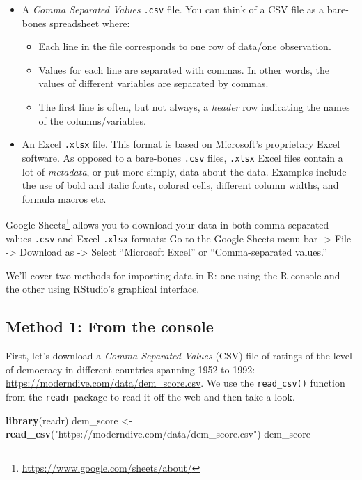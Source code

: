 \documentclass[12pt,]{krantz}
\makeatletter
\newenvironment{Shaded}{\begin{snugshade}}{\end{snugshade}}
\newcommand{\KeywordTok}[1]{\textcolor[rgb]{0.27,0.27,0.27}{\textbf{#1}}}
\newcommand{\StringTok}[1]{\textcolor[rgb]{0.5,0.5,0.5}{#1}}
\newcommand{\NormalTok}[1]{#1}
\providecommand{\tightlist}{%
  \setlength{\itemsep}{0pt}\setlength{\parskip}{0pt}}
\renewcommand{\href}[2]{#2\footnote{\url{#1}}}
\newenvironment{kframe}{%
\medskip{}
\setlength{\fboxsep}{.8em}
 \def\at@end@of@kframe{}%
 \ifinner\ifhmode%
  \def\at@end@of@kframe{\end{minipage}}%
  \begin{minipage}{\columnwidth}%
 \fi\fi%
 \def\FrameCommand##1{\hskip\@totalleftmargin \hskip-\fboxsep
 \colorbox{shadecolor}{##1}\hskip-\fboxsep
     \hskip-\linewidth \hskip-\@totalleftmargin \hskip\columnwidth}%
 \MakeFramed {\advance\hsize-\width
   \@totalleftmargin\z@ \linewidth\hsize
   \@setminipage}}%
 {\par\unskip\endMakeFramed%
 \at@end@of@kframe}
\renewenvironment{Shaded}{\begin{kframe}}{\end{kframe}}
\theoremstyle{definition}
\theoremstyle{definition}
\theoremstyle{definition}
\theoremstyle{remark}
\makeatother
\begin{document}
\begin{itemize}
\tightlist
\item
  A \emph{Comma Separated Values} \texttt{.csv} file. You can think of a
  CSV file as a bare-bones spreadsheet where:

  \begin{itemize}
  \tightlist
  \item
    Each line in the file corresponds to one row of data/one
    observation.
  \item
    Values for each line are separated with commas. In other words, the
    values of different variables are separated by commas.
  \item
    The first line is often, but not always, a \emph{header} row
    indicating the names of the columns/variables.
  \end{itemize}
\item
  An Excel \texttt{.xlsx} file. This format is based on Microsoft's
  proprietary Excel software. As opposed to a bare-bones \texttt{.csv}
  files, \texttt{.xlsx} Excel files contain a lot of \emph{metadata}, or
  put more simply, data about the data. Examples include the use of bold
  and italic fonts, colored cells, different column widths, and formula
  macros etc.
\end{itemize}

\href{https://www.google.com/sheets/about/}{Google Sheets} allows you to
download your data in both comma separated values \texttt{.csv} and
Excel \texttt{.xlsx} formats: Go to the Google Sheets menu bar
-\textgreater{} File -\textgreater{} Download as -\textgreater{} Select
``Microsoft Excel'' or ``Comma-separated values.''

We'll cover two methods for importing data in R: one using the R console
and the other using RStudio's graphical interface.

\subsection{Method 1: From the console}\label{method-1-from-the-console}

First, let's download a \emph{Comma Separated Values} (CSV) file of
ratings of the level of democracy in different countries spanning 1952
to 1992: \url{https://moderndive.com/data/dem_score.csv}. We use the
\texttt{read\_csv()} function from the \texttt{readr} package to read it
off the web and then take a look.

\begin{Shaded}
\begin{Highlighting}[]
\KeywordTok{library}\NormalTok{(readr)}
\NormalTok{dem_score <-}\StringTok{ }\KeywordTok{read_csv}\NormalTok{(}\StringTok{"https://moderndive.com/data/dem_score.csv"}\NormalTok{)}
\NormalTok{dem_score}
\end{Highlighting}
\end{Shaded}
\end{document}
